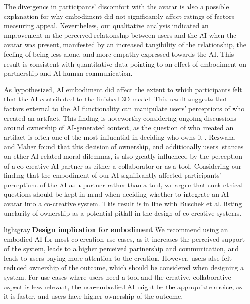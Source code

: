 The divergence in participants' discomfort with the avatar is also a possible explanation for why embodiment did not significantly affect ratings of factors measuring appeal. Nevertheless, our qualitative analysis indicated an improvement in the perceived relationship between users and the AI when the avatar was present, manifested by an increased tangibility of the relationship, the feeling of being less alone, and more empathy expressed towards the AI. This result is consistent with quantitative data pointing to an effect of embodiment on partnership and AI-human communication.


As hypothesized, AI embodiment did affect the extent to which participants felt that the AI contributed to the finished 3D model. This result suggests that factors external to the AI functionality can manipulate users' perceptions of who created an artifact. This finding is noteworthy considering ongoing discussions around ownership of AI-generated content, as the question of who created an artifact is often one of the most influential in deciding who owns it \cite{rezwana_user_2023}. Rezwana and Maher \cite{rezwana_user_2023} found that this decision of ownership, and additionally users' stances on other AI-related moral dilemmas, is also greatly influenced by the perception of a co-creative AI partner as either a collaborator or as a tool. Considering our finding that the embodiment of our AI significantly affected participants' perceptions of the AI as a partner rather than a tool, we argue that such ethical questions should be kept in mind when deciding whether to integrate an AI avatar into a co-creative system. This result is in line with Buschek et al. \cite{buschek_nine_2021} listing unclarity of ownership as a potential pitfall in the design of co-creative systems.


\begin{leftbar}{lightgray}
    \noindent \textbf{Design implication for embodiment}\quad
    We recommend using an embodied AI for most co-creation use cases, as it increases the perceived support of the system, leads to a higher perceived partnership and communication, and leads to users paying more attention to the creation. However, users also felt reduced ownership of the outcome, which should be considered when designing a system. For use cases where users need a tool and the creative, collaborative aspect is less relevant, the non-embodied AI might be the appropriate choice, as it is faster, and users have higher ownership of the outcome.
\end{leftbar}  







